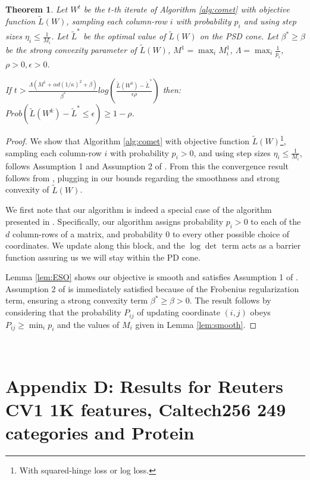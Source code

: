 \documentclass{article} %
\newcommand\mat[1]{{#1}}
\newcommand{\W}{\mat{W}}
\newcommand{\Pp}{\mat{P}}
\newcommand{\tL}{\tilde{L}(\W)}
\newtheorem{theorem}{Theorem}
\begin{document}
\begin{theorem}
Let $\W^t$ be the $t$-th iterate of Algorithm \ref{alg:comet} with objective function $\tL$, sampling each column-row $i$ with probability $p_i$ and using step sizes $\eta_i \leq \frac{1}{M_i}$. Let $\tilde{L}^*$ be the optimal value of $\tL$ on the PSD cone. Let $\beta^* \geq \beta$ be the strong convexity parameter of $\tL$, $M^1 = \max_i M^1_i$, $\Lambda = \max_i \frac{1}{p_i}$, $\rho >0, \epsilon>0$.

If $t > \frac{\Lambda (M^1 + \alpha d (1/\kappa)^2 + \beta)}{\beta^*} log \left( \frac{\tilde{L}(W^0) - \tilde{L}^*}{\epsilon \rho}\right)$ then: $Prob(\tilde{L}(\W^k) - \tilde{L}^* \leq \epsilon) \geq 1-\rho$.
\end{theorem}
\begin{proof}%
We show that Algorithm \ref{alg:comet} with objective function $\tL$\footnote{With squared-hinge loss or log loss.}, sampling each column-row $i$ with probability $p_i >0$, and using step sizes $\eta_i \leq \frac{1}{M_i}$, follows Assumption 1 and Assumption 2 of \citet{richtarik2013optimal}. From this the convergence result follows from \citeauthor[Theorem 3]{richtarik2013optimal}, plugging in our bounds regarding the smoothness and strong convexity of $\tL$.

We first note that our algorithm is indeed a special case of the algorithm presented in \citet{richtarik2013optimal}. Specifically, our algorithm assigns probability $p_i > 0 $ to each of the $d$ column-rows of a matrix, and probability $0$ to every other possible choice of coordinates. We update along this block, and the $\log \det$ term acts as a barrier function
assuring us we will stay within the PD cone.

Lemma \ref{lem:ESO} shows our objective is smooth and satisfies Assumption 1 of \citeauthor{richtarik2013optimal}. Assumption 2 of \citeauthor{richtarik2013optimal} is immediately satisfied because of the Frobenius regularization term, ensuring a strong convexity term $\beta^* \geq \beta > 0$. The result follows by considering that the probability $\Pp_{ij}$ of updating coordinate $(i,j)$ obeys $\Pp_{ij} \geq \min_i p_i $ and the values of $M_i$ given in Lemma \ref{lem:smooth}.

\end{proof}


%
\


\small{

%
}

\newpage
\section*{Appendix D: Results for Reuters CV1 1K features, Caltech256 249 categories and Protein}
\end{document}
